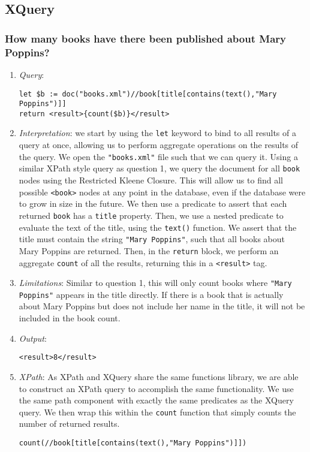 \documentclass[11pt]{article}
\begin{document}
\subsection{XQuery}

\subsubsection{How many books have there been published about Mary Poppins?}

\begin{enumerate}
\item \textit{Query}:
\begin{small}
\begin{verbatim}
let $b := doc("books.xml")//book[title[contains(text(),"Mary Poppins")]]
return <result>{count($b)}</result>
\end{verbatim}
\end{small}
\item \textit{Interpretation}: we start by using the \texttt{let} keyword to bind to all results of a query at once, allowing us to perform aggregate operations on the results of the query. We open the \texttt{"books.xml"} file such that we can query it. Using a similar XPath style query as question 1, we query the document for all \texttt{book} nodes using the Restricted Kleene Closure. This will allow us to find all possible \texttt{<book>} nodes at any point in the database, even if the database were to grow in size in the future. We then use a predicate to assert that each returned \texttt{book} has a \texttt{title} property. Then, we use a nested predicate to evaluate the text of the title, using the \texttt{text()} function. We assert that the title must contain the string \texttt{"Mary Poppins"}, such that all books about Mary Poppins are returned. Then, in the \texttt{return} block, we perform an aggregate \texttt{count} of all the results, returning this in a \texttt{<result>} tag.
\item \textit{Limitations}: Similar to question 1, this will only count books where \texttt{"Mary Poppins"} appears in the title directly. If there is a book that is actually about Mary Poppins but does not include her name in the title, it will not be included in the book count.
\item \textit{Output}:
\begin{verbatim}
<result>8</result>
\end{verbatim} 
\item \textit{XPath}: As XPath and XQuery share the same functions library, we are able to construct an XPath query to accomplish the same functionality. We use the same path component with exactly the same predicates as the XQuery query. We then wrap this within the \texttt{count} function that simply counts the number of returned results.
\begin{verbatim}
count(//book[title[contains(text(),"Mary Poppins")]])
\end{verbatim}
\end{enumerate}
\end{document}

